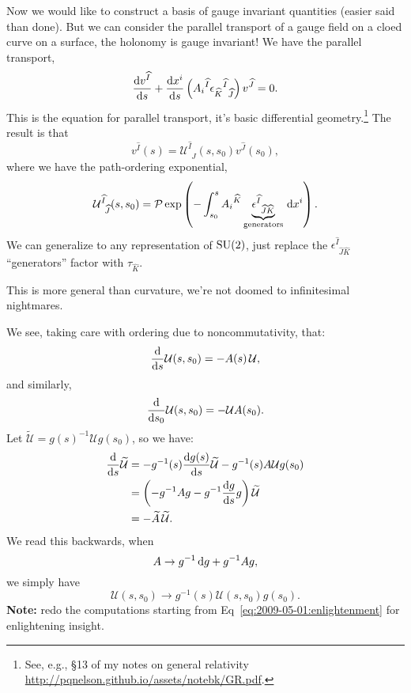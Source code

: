 Now we would like to construct a basis of gauge invariant quantities
(easier said than done). But we can consider the parallel transport of a
gauge field on a cloed curve on a surface, the holonomy is gauge
invariant! We have the parallel transport,
\begin{equation}
\frac{\mathrm{d} v^{\widehat{I}}}{\mathrm{d} s}
+ \frac{\mathrm{d} x^{i}}{\mathrm{d} s}\left({A_{i}}^{\widehat{I}}{{\epsilon_{\widehat{K}}}^{\widehat{I}}}_{\widehat{J}}\right)v^{\widehat{J}} = 0.
\end{equation}
This is the equation for parallel transport, it's basic differential
geometry.\footnote{See, e.g., \S13 of my notes on general relativity
\url{http://pqnelson.github.io/assets/notebk/GR.pdf}.} The result is that
\begin{equation}
v^{\widehat{I}}(s) = \mathcal{U}^{\widehat{I}}_{\phantom{I}\widehat{J}}(s,s_{0})v^{\widehat{J}}(s_{0}),
\end{equation}
where we have the path-ordering exponential,
\begin{equation}
\mathcal{U}^{\widehat{I}}_{\phantom{I}\widehat{J}}(s,s_{0}) =
\mathcal{P}\exp\left(-\int^{s}_{s_{0}}{A_{i}}^{\widehat{K}}\underbrace{\epsilon^{\widehat{I}}_{\phantom{I}\widehat{J}\widehat{K}}}_{\text{generators}}\,\mathrm{d} x^{i}\right).
\end{equation}
We can generalize to any representation of $\operatorname{SU}(2)$, just replace the
$\epsilon^{\widehat{I}}_{\phantom{I}\widehat{J}\widehat{K}}$
``generators'' factor with $\tau_{\widehat{K}}$.

This is more general than curvature, we're not doomed to infinitesimal nightmares.

We see, taking care with ordering due to noncommutativity, that:
\begin{equation}\label{eq:2009-05-01:enlightenment}
\frac{\mathrm{d}}{\mathrm{d} s}\mathcal{U}(s,s_{0}) = -A(s)\,\mathcal{U},
\end{equation}
and similarly,
\begin{equation}
\frac{\mathrm{d}}{\mathrm{d} s_{0}}\mathcal{U}(s,s_{0}) = -\mathcal{U}A(s_{0}).
\end{equation}
Let $\widetilde{\mathcal{U}} = g(s)^{-1}\mathcal{U}g(s_{0})$, so we
have:
\begin{subequations}
\begin{align}
\frac{\mathrm{d}}{\mathrm{d} s}\widetilde{\mathcal{U}}
&= - g^{-1}(s)\frac{\mathrm{d} g(s)}{\mathrm{d} s}\widetilde{\mathcal{U}}-g^{-1}(s)A\mathcal{U}g(s_{0})\\
&= \left(-g^{-1}Ag - g^{-1}\frac{\mathrm{d} g}{\mathrm{d} s}g\right)\widetilde{\mathcal{U}}\\
&= - \widetilde{A}\,\widetilde{\mathcal{U}}.
\end{align}
\end{subequations}
We read this backwards, when
\begin{equation}
A\to g^{-1}\,\mathrm{d} g + g^{-1}Ag,
\end{equation}
we simply have
\begin{equation}
\mathcal{U}(s,s_{0})\to g^{-1}(s)\mathcal{U}(s,s_{0})g(s_{0}).
\end{equation}
\textbf{Note:} redo the computations starting from Eq~\eqref{eq:2009-05-01:enlightenment}
for enlightening insight.

